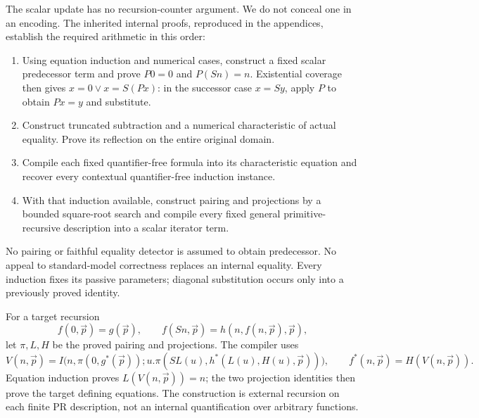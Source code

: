 \documentclass[11pt,a4paper]{article}
\theoremstyle{definition}\newtheorem{definition}[theorem]{Definition}
\begin{document}
The scalar update has no recursion-counter argument. We do not conceal
one in an encoding. The inherited internal proofs, reproduced in the
appendices, establish the required arithmetic in this order:
\begin{enumerate}
\item Using equation induction and numerical cases, construct a fixed
scalar predecessor term and prove $P0=0$ and $P(Sn)=n$.
Existential coverage then gives $x=0\vee x=S(Px)$: in the successor
case $x=Sy$, apply $P$ to obtain $Px=y$ and substitute.
\item Construct truncated subtraction and a numerical characteristic
of actual equality. Prove its reflection on the entire original domain.
\item Compile each fixed quantifier-free formula into its characteristic
equation and recover every contextual quantifier-free induction instance.
\item With that induction available, construct pairing and projections
by a bounded square-root search and compile every fixed general
primitive-recursive description into a scalar iterator term.
\end{enumerate}
No pairing or faithful equality detector is assumed to obtain
predecessor. No appeal to standard-model correctness replaces an
internal equality. Every induction fixes its passive parameters;
diagonal substitution occurs only into a previously proved identity.

For a target recursion
\[
f(0,\vec p)=g(\vec p),\qquad
f(Sn,\vec p)=h(n,f(n,\vec p),\vec p),
\]
let $\pi,L,H$ be the proved pairing and projections. The compiler uses
\[
V(n,\vec p)=I\bigl(n,\pi(0,g^*(\vec p));
u.\pi(SL(u),h^*(L(u),H(u),\vec p))\bigr),
\qquad f^*(n,\vec p)=H(V(n,\vec p)).
\]
Equation induction proves $L(V(n,\vec p))=n$; the two projection
identities then prove the target defining equations. The construction
is external recursion on each finite PR description, not an internal
quantification over arbitrary functions.
\end{document}
